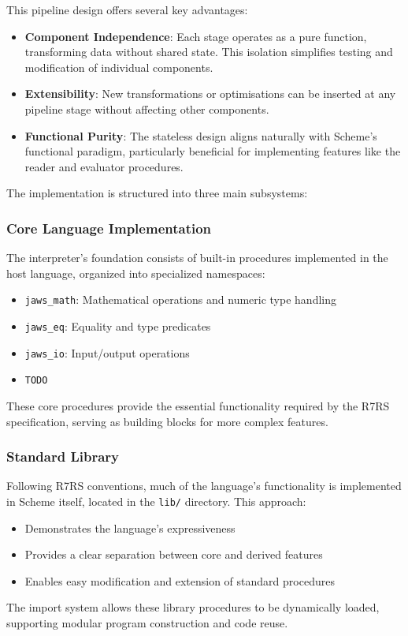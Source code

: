 \documentclass[final]{cmpreport_02}
\begin{document}
This pipeline design offers several key advantages:
\begin{itemize}
\item \textbf{Component Independence}: Each stage operates as a pure function, transforming data without shared state. This isolation simplifies testing and modification of individual components.
\item \textbf{Extensibility}: New transformations or optimisations can be inserted at any pipeline stage without affecting other components.
\item \textbf{Functional Purity}: The stateless design aligns naturally with Scheme's functional paradigm, particularly beneficial for implementing features like the reader and evaluator procedures.
\end{itemize}
The implementation is structured into three main subsystems:
\subsubsection{Core Language Implementation}
The interpreter's foundation consists of built-in procedures implemented in the host language, organized into specialized namespaces:
\begin{itemize}
\item \texttt{jaws\_math}: Mathematical operations and numeric type handling
\item \texttt{jaws\_eq}: Equality and type predicates
\item \texttt{jaws\_io}: Input/output operations
\item \texttt{TODO}
\end{itemize}
These core procedures provide the essential functionality required by the R7RS specification, serving as building blocks for more complex features.
\subsubsection{Standard Library}
Following R7RS conventions, much of the language's functionality is implemented in Scheme itself, located in the \texttt{lib/} directory. This approach:
\begin{itemize}
\item Demonstrates the language's expressiveness
\item Provides a clear separation between core and derived features
\item Enables easy modification and extension of standard procedures
\end{itemize}
The import system allows these library procedures to be dynamically loaded, supporting modular program construction and code reuse.
\end{document}
